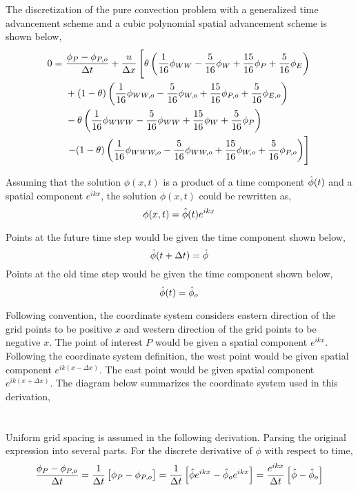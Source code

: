 \documentclass[class=report, 12pt, crop=false]{standalone}
\def\sized{0.14}
\begin{document}
\begin{center}
The discretization of the pure convection problem with a generalized time advancement scheme and a cubic polynomial spatial advancement scheme is shown below,
\begin{equation*}
\begin{split}
0 =\,\, &\frac{\phi_{P} - \phi_{P,o}}{\Delta t} + \frac{u}{\Delta x}\left[ \theta\left(\frac{1}{16}\phi_{WW} - \frac{5}{16}\phi_{W} + \frac{15}{16}\phi_{P} + \frac{5}{16}\phi_{E}\right) \right.
\\ & + (1-\theta)\left( \frac{1}{16}\phi_{WW,o} - \frac{5}{16}\phi_{W,o} + \frac{15}{16}\phi_{P,o} + \frac{5}{16}\phi_{E,o}\right)
\\ & -\theta \left( \frac{1}{16}\phi_{WWW} - \frac{5}{16}\phi_{WW} + \frac{15}{16}\phi_{W} + \frac{5}{16}\phi_{P}\right)
\\ & \left. - (1-\theta)\left( \frac{1}{16}\phi_{WWW,o} - \frac{5}{16}\phi_{WW,o} + \frac{15}{16}\phi_{W,o} + \frac{5}{16}\phi_{P,o}\right)\right]
\end{split}
\end{equation*}


Assuming that the solution $\phi(x,t)$ is a product of a time component $\hat{\phi}(t)$ and a spatial component $e^{ikx}$, the solution $\phi(x,t)$ could be rewritten as,
$$\phi(x,t) = \hat{\phi}(t)e^{ikx}$$


Points at the future time step would be given the time component shown below,
$$\hat{\phi}(t+\Delta t) = \hat{\phi}$$
Points at the old time step would be given the time component shown below,
$$\hat{\phi}(t) = \hat{\phi}_o$$

Following convention, the coordinate system considers eastern direction of the grid points to be positive $x$ and western direction of the grid points to be negative $x$. The point of interest $P$ would be given a spatial component $e^{ikx}$. Following the coordinate system definition, the west point would be given spatial component $e^{ik(x-\Delta x)}$. The east point would be given spatial component $e^{ik(x+\Delta x)}$. The diagram below summarizes the coordinate system used in this derivation,
\\~\\~\\Uniform grid spacing is assumed in the following derivation. Parsing the original expression into several parts. 
For the discrete derivative of $\phi$ with respect to time,
$$\frac{\phi_{P} - \phi_{P,o}}{\Delta t} = \frac{1}{\Delta t}\left[\phi_{P} - \phi_{P,o}\right] = \frac{1}{\Delta t}\left[\hat{\phi}e^{ikx} - \hat{\phi}_oe^{ikx}\right] = \frac{e^{ikx}}{\Delta t}\left[\hat{\phi} - \hat{\phi}_o\right]$$


\end{center}
\end{document}
